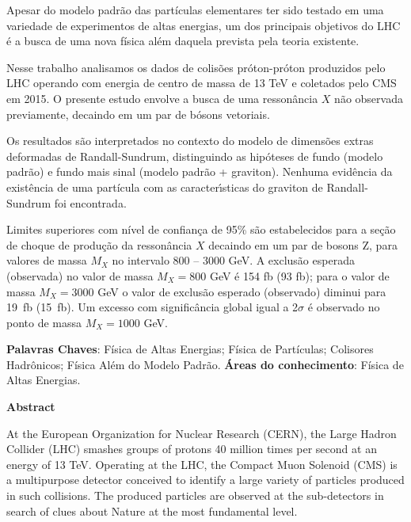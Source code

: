 Apesar do modelo padr\~ao das part\'iculas elementares ter sido testado em uma variedade de experimentos de altas energias, um dos principais objetivos do LHC \'e a busca de uma nova f\'isica al\'em daquela prevista pela teoria existente. 

Nesse trabalho analisamos os dados de colis\~oes pr\'oton-pr\'oton produzidos pelo LHC operando com energia de centro de massa de 13 TeV e coletados pelo CMS em 2015. O presente estudo envolve a busca de uma resson\^ancia $X$ n\~ao observada previamente, decaindo em um par de b\'osons vetoriais.

Os resultados s\~ao interpretados no contexto do modelo de dimens\~oes extras deformadas de Randall-Sundrum, distinguindo as hip\'oteses de fundo (modelo padr\~ao) e fundo mais sinal (modelo padr\~ao + graviton). Nenhuma evid\^encia da exist\^encia de uma part\'icula com as caracter\'{\i}sticas do graviton de Randall-Sundrum foi encontrada.%

Limites superiores com n\'ivel de confian\c{c}a de 95\% s\~ao estabelecidos para a se\c{c}\~ao de choque de produ\c{c}\~ao da resson\^ancia $X$ decaindo em um par de bosons Z, para valores de massa $M_{X}$ no intervalo 800 -- 3000 GeV. A exclus\~ao esperada (observada) no valor de massa $M_X=800$ GeV \'e 154 fb (93 fb); para o valor de massa $M_X=3000$ GeV o valor de exclus\~ao esperado (observado) diminui para 19~fb (15~fb). Um excesso com signific\^ancia global igual a 2$\sigma$ \'e observado no ponto de massa $M_X=1000$ GeV.


\vskip 1.0cm
\noindent
{\bf Palavras Chaves}: F\'isica de Altas Energias; F\'isica de Part\'iculas; Colisores Hadr\^onicos; F\'isica Al\'em do Modelo Padr\~ao.
\vskip 0.5cm
\noindent
{\bf \'Areas do conhecimento}: F\'isica de Altas Energias.

\newpage

\begin{center}
{\LARGE \textsf{\textbf{Abstract}}}
\end{center}
\vskip 2.0cm


At the European Organization for Nuclear Research (CERN), the Large Hadron Collider (LHC) smashes groups of protons 40 million times per second at an energy of 13 TeV. Operating at the LHC, the Compact Muon Solenoid (CMS) is a multipurpose detector conceived to identify a large variety of particles produced in such collisions. The produced particles are observed at the sub-detectors in search of clues about Nature at the most fundamental level.

